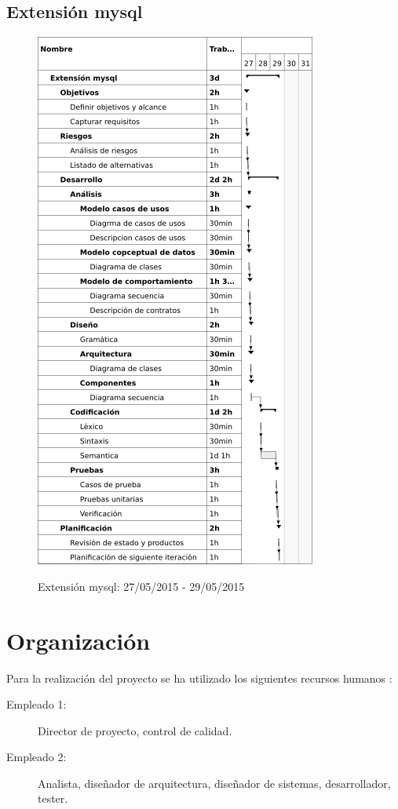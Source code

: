 \subsection{Extensión mysql}
\begin{center}
\begin{figure}[H]
\centering
\includegraphics[scale=1]{planning/30-extension-mysql.png} \\
\caption{Extensión mysql: 27/05/2015 - 29/05/2015 }
\end{figure}
\end{center}





\section{Organización}
Para la realización del proyecto se ha utilizado los siguientes recursos humanos :
\begin{description}
\item[Empleado 1:] Director de proyecto, control de calidad. 
\item[Empleado 2:] Analista, diseñador de arquitectura, diseñador de sistemas, desarrollador, tester.
\end{description}

